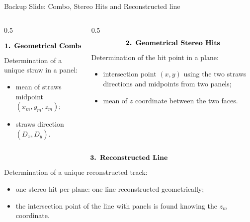 \documentclass{beamer}[10pt]
\begin{document}
\begin{frame}{Backup Slide: Combo, Stereo Hits and Reconstructed line}
  \vspace{-3mm}
\begin{columns}
\begin{column}{0.5\framewidth}
  \vspace{-15mm}

  $$\textbf{\text{1. Geometrical Combo Hits}}$$
  Determination of a unique straw in a panel:
  \begin{itemize}
    \item mean of straws midpoint $(x_m,y_m,z_m)$;
    \item straws direction $(D_x,D_y)$.
  \end{itemize}
\end{column}
\begin{column}{0.5\framewidth}
  $$\textbf{\text{2. Geometrical Stereo Hits}}$$
  Determination of the hit point in a plane:
  \begin{itemize}
    \item intersection point $(x,y)$ using the two straws directions and midpoints from two panels;
    \item mean of $z$ coordinate between the two faces.
  \end{itemize}
\end{column}
\end{columns}
\vspace{5mm}

$$\textbf{\text{3. Reconstructed Line}}$$
Determination of a unique reconstructed track:
\begin{itemize}
\item one stereo hit per plane: one line reconstructed geometrically;
\item the intersection point of the line with panels is found knowing the $z_m$ coordinate. 
\end{itemize}

\end{frame}
\end{document}
